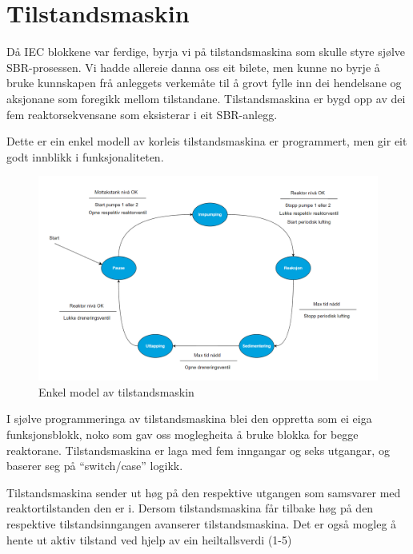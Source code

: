 \section{Tilstandsmaskin}
\thispagestyle{fancy}

Då \gls{IEC} blokkene var ferdige, byrja vi på tilstandsmaskina som skulle styre sjølve \gls{SBR}-prosessen. 
Vi hadde allereie danna oss eit bilete, men kunne no byrje å bruke kunnskapen frå anleggets verkemåte
til å grovt fylle inn dei hendelsane og aksjonane som foregikk mellom tilstandane. 
Tilstandsmaskina er bygd opp av dei fem reaktorsekvensane som eksisterar i eit \gls{SBR}-anlegg.

Dette er ein enkel modell av korleis tilstandsmaskina er programmert, men gir eit godt innblikk i funksjonaliteten. \newline \newline \newline \newline \newline

\begin{figure}[htbp]
    \centering
    \includegraphics[width=1\textwidth]{Figurar/Simpel tilstandsmaskin.png}
    \caption{Enkel model av tilstandsmaskin}\label{fig:SimpelTilstandsmaskin}
\end{figure}


\newpage

I sjølve programmeringa av tilstandsmaskina blei den oppretta som ei eiga funksjonsblokk, noko som gav oss moglegheita å bruke blokka for begge reaktorane.
Tilstandsmaskina er laga med fem inngangar og seks utgangar, og baserer seg på ``switch/case'' logikk.

Tilstandsmaskina sender ut høg på den respektive utgangen som samsvarer med reaktortilstanden den er i. Dersom tilstandsmaskina får tilbake
høg på den respektive tilstandsinngangen avanserer tilstandsmaskina.
Det er også mogleg å hente ut aktiv tilstand ved hjelp av ein heiltallsverdi (1-5) \newline \newline \newline \newline

